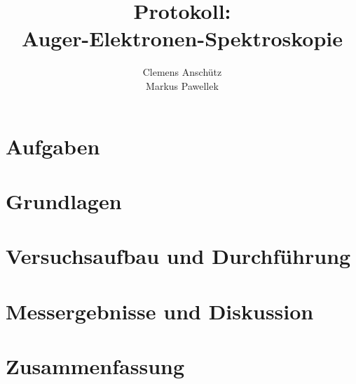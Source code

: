 \documentclass[12pt, oneside, a4paper]{article}
\title{Protokoll: \\ Auger-Elektronen-Spektroskopie}
\author{Clemens Anschütz \\ Markus Pawellek}
\begin{document}
	

	\maketitle
	\newpage

	\section{Aufgaben} %
	\label{sec:aufgaben}

		


	\newpage

	\section{Grundlagen} %
	\label{sec:grundlagen}
	
		


	\newpage

	\section{Versuchsaufbau und Durchführung} %
	\label{sec:versuchsaufbau_und_durchf_hrung}

		
	

	\newpage

	\section{Messergebnisse und Diskussion} %
	\label{sec:messergebnisse}

		
	

	\newpage

	\section{Zusammenfassung} %
	\label{sec:zusammenfassung}
	
\end{document}
